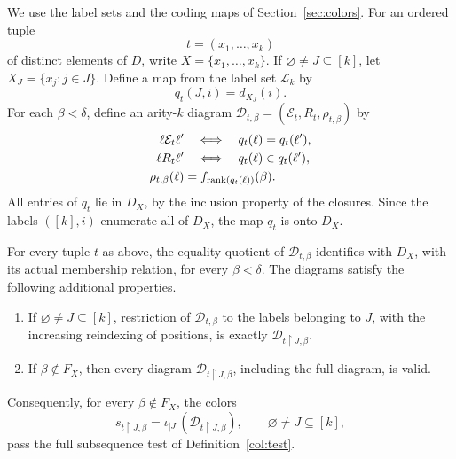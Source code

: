 We use the label sets and the coding maps of
Section~\ref{sec:colors}.  For an ordered tuple
\[
  t=(x_1,\ldots,x_k)
\]
of distinct elements of \(D\), write \(X=\{x_1,\ldots,x_k\}\).
If \(\varnothing\ne J\subseteq[k]\), let
\(X_J=\{x_j:j\in J\}\).  Define a map from the label set
\(\mathcal L_k\) by
\[
  q_t(J,i)=d_{X_J}(i).
\]
For each \(\beta<\delta\), define an arity-\(k\) diagram
\(\mathcal D_{t,\beta}=(\mathcal E_t,R_t,\rho_{t,\beta})\) by
\begin{align}
  \ell\mathcal E_t\ell'
  &\quad\Longleftrightarrow\quad
      q_t(\ell)=q_t(\ell'), \label{end:diagram-equality}\\
  \ell R_t\ell'
  &\quad\Longleftrightarrow\quad
      q_t(\ell)\in q_t(\ell'), \label{end:diagram-membership}\\
  \rho_{t,\beta}(\ell)
  &=f_{\operatorname{rank}(q_t(\ell))}(\beta).
      \label{end:diagram-tags}
\end{align}
All entries of \(q_t\) lie in \(D_X\), by the inclusion
property of the closures.  Since the labels \(([k],i)\)
enumerate all of \(D_X\), the map \(q_t\) is onto \(D_X\).

\begin{lemma}\label{end:diagrams}
For every tuple \(t\) as above, the equality quotient of
\(\mathcal D_{t,\beta}\) identifies with \(D_X\), with its
actual membership relation, for every \(\beta<\delta\).
The diagrams satisfy the following additional properties.
\begin{enumerate}[label=\textup{(\roman*)}]
  \item If \(\varnothing\ne J\subseteq[k]\), restriction of
        \(\mathcal D_{t,\beta}\) to the labels belonging to
        \(J\), with the increasing reindexing of positions,
        is exactly \(\mathcal D_{t\restriction J,\beta}\).
  \item If \(\beta\notin F_X\), then every diagram
        \(\mathcal D_{t\restriction J,\beta}\), including the full
        diagram, is valid.
\end{enumerate}
Consequently, for every \(\beta\notin F_X\), the colors
\[
  s_{t\restriction J,\beta}
    =\iota_{|J|}(\mathcal D_{t\restriction J,\beta}),
  \qquad \varnothing\ne J\subseteq[k],
\]
pass the full subsequence test of
Definition~\ref{col:test}.
\end{lemma}

